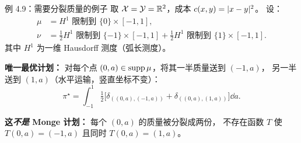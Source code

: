 \begin{frame}{例 4.9：需要分裂质量的例子}
  取 $\mathcal{X}=\mathcal{Y}=\mathbb{R}^2$，成本 $c(x,y)=\lvert x-y\rvert^2$。
  设：
  \begin{align*}
    \mu &= H^1 \text{ 限制到 } \{0\}\times[-1,1], \\
    \nu &= \tfrac{1}{2}H^1 \text{ 限制到 } \{-1\}\times[-1,1]
           + \tfrac{1}{2}H^1 \text{ 限制到 } \{1\}\times[-1,1].
  \end{align*}
  其中 $H^1$ 为一维 Hausdorff 测度（弧长测度）。

  \textbf{唯一最优计划：} 对每个点 $(0,a)\in\operatorname{supp}\mu$，将其一半质量送到 $(-1,a)$，
  另一半送到 $(1,a)$（水平运输，竖直坐标不变）：
  \[
    \pi^\star = \int_{-1}^{1} \tfrac{1}{2}\bigl[\delta_{((0,a),(-1,a))}+\delta_{((0,a),(1,a))}\bigr]\dd a.
  \]

  \textbf{这\emph{不是} Monge 计划：} 每个 $(0,a)$ 的质量被分裂成两份，
  不存在函数 $T$ 使 $T(0,a)=(-1,a)$ 且同时 $T(0,a)=(1,a)$。

\end{frame}

